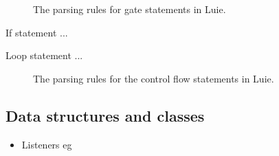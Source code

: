 \begin{figure}[htp]
    \centering
    
    \caption{The parsing rules for gate statements in Luie.}
    \label{fig:implementation_grammarGateStatements}
\end{figure}

If statement ...

Loop statement ...

\begin{figure}[htp]
    \centering
    
    \caption{The parsing rules for the control flow statements in Luie.}
    \label{fig:implementation_controlFlowStatements}
\end{figure}

\subsection{Data structures and classes}
\label{sec:implementation_syntax_dataStructuresClasses}
\begin{itemize}
    \item Listeners eg
\end{itemize}
